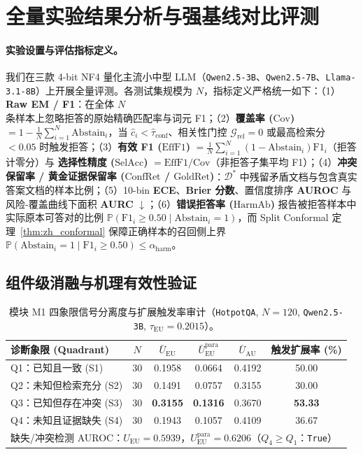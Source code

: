 \documentclass[11pt]{article}
\begin{document}
\section{全量实验结果分析与强基线对比评测}

\paragraph{实验设置与评估指标定义。} 我们在三款 4-bit NF4 量化主流小中型 LLM（\texttt{Qwen2.5-3B}、\texttt{Qwen2.5-7B}、\texttt{Llama-3.1-8B}）上开展全量评测。各测试集规模为 $N$，指标定义严格统一如下：（1）\textbf{Raw EM / F1}：在全体 $N$ 条样本上忽略拒答的原始精确匹配率与词元 F1；（2）\textbf{覆盖率 ($\text{Cov}$)} $= 1 - \frac{1}{N}\sum_{i=1}^N \text{Abstain}_i$，当 $\hat{c}_i < \hat{\tau}_{\text{conf}}$、相关性门控 $\mathcal{G}_{\text{rel}}=0$ 或最高检索分 $<0.05$ 时触发拒答；（3）\textbf{有效 F1 ($\text{EffF1}$)} $= \frac{1}{N}\sum_{i=1}^N (1-\text{Abstain}_i)\text{F1}_i$（拒答计零分）与 \textbf{选择性精度 ($\text{SelAcc}$)} $= \text{EffF1}/\text{Cov}$（非拒答子集平均 F1）；（4）\textbf{冲突保留率 / 黄金证据保留率 ($\text{ConfRet}$ / $\text{GoldRet}$)}：$\mathcal{D}^*$ 中残留矛盾文档与包含真实答案文档的样本比例；（5）10-bin \textbf{ECE}、\textbf{Brier 分数}、置信度排序 \textbf{AUROC} 与风险-覆盖曲线下面积 \textbf{AURC} $\downarrow$；（6）\textbf{错误拒答率 ($\text{HarmAb}$)} 报告被拒答样本中实际原本可答对的比例 $\mathbb{P}(\text{F1}_i \ge 0.50 \mid \text{Abstain}_i = 1)$，而 Split Conformal 定理~\ref{thm:zh_conformal} 保障正确样本的召回侧上界 $\mathbb{P}(\text{Abstain}_i = 1 \mid \text{F1}_i \ge 0.50) \le \alpha_{\text{harm}}$。

\subsection{组件级消融与机理有效性验证}

\begin{table}[t]
\centering
\small
\setlength{\tabcolsep}{16pt}
\caption{模块 M1 四象限信号分离度与扩展触发率审计（\texttt{HotpotQA}, $N=120$, \texttt{Qwen2.5-3B}, $\tau_{\text{EU}} = 0.2015$）。}
\label{tab:zh_wp8_m1}
\begin{tabular}{lccccc}
\toprule
\textbf{诊断象限 (Quadrant)} & $N$ & $\bar{U}_{\text{EU}}$ & $\bar{U}_{\text{EU}}^{\text{para}}$ & $\bar{U}_{\text{AU}}$ & \textbf{触发扩展率 (\%)} \\
\midrule
Q1：已知且一致 (S1) & 30 & 0.1958 & 0.0664 & 0.4192 & 50.00 \\
Q2：未知但检索充分 (S2) & 30 & 0.1491 & 0.0757 & 0.3155 & 30.00 \\
Q3：已知但存在冲突 (S3) & 30 & \textbf{0.3155} & \textbf{0.1316} & 0.3670 & \textbf{53.33} \\
Q4：未知且证据缺失 (S4) & 30 & 0.1943 & 0.1057 & 0.4109 & 36.67 \\
\midrule
\multicolumn{6}{l}{缺失/冲突检测 AUROC：$U_{\text{EU}} = 0.5939$，$U_{\text{EU}}^{\text{para}} = \mathbf{0.6206}$（$Q_4 \ge Q_1$：\texttt{True}）} \\
\bottomrule
\end{tabular}
\end{table}
\end{document}
